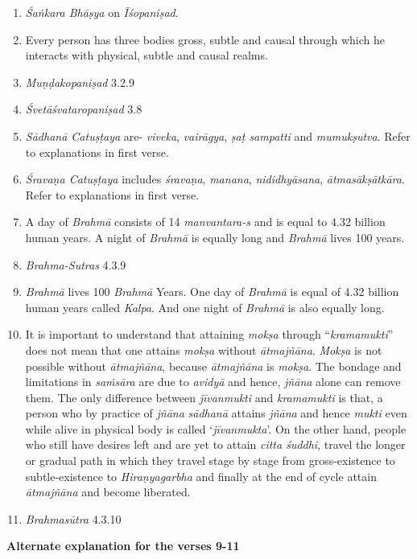 \begin{enumerate}
\itemsep=0pt
\item
  \emph{Śaṅkara Bhāṣya} on \emph{Īśopaniṣad}.
\item
  Every person has three bodies gross, subtle and causal through which he interacts with physical, subtle and causal realms.
\item
  \emph{Muṇḍakopaniṣad} 3.2.9
\item
  \emph{Śvetāśvataropaniṣad} 3.8
\item
  \emph{Sādhanā Catuṣṭaya} are- \emph{viveka}, \emph{vairāgya}, \emph{ṣaṭ sampatti} and \emph{mumu\-kṣutva}. Refer to explanations in first verse.
\item
  \emph{Śravaṇa Catuṣṭaya} includes \emph{śravaṇa}, \emph{manana}, \emph{nididhyāsana}, \emph{ātma\-sākṣāt\-kāra}. Refer to explanations in first verse.
\item
  A day of \emph{Brahmā} consists of 14 \emph{manvantara-s} and is equal to 4.32 billion human years. A night of \emph{Brahmā} is equally long and \emph{Brahmā} lives 100 years.
\item
  \emph{Brahma-Sutras} 4.3.9
\item
  \emph{Brahmā} lives 100 \emph{Brahmā} Years. One day of \emph{Brahmā} is equal of 4.32 billion human years called \emph{Kalpa}. And one night of \emph{Brahmā} is also equally long.
\item
  It is important to understand that attaining \emph{mokṣa} through ``\emph{kramamukti}'' does not mean that one attains \emph{mokṣa} without \emph{ātmajñāna}. \emph{Mokṣa} is not possible without \emph{ātmajñāna}, because \emph{ātmajñāna} is \emph{mokṣa}. The bondage and limitations in \emph{saṁsāra} are due to \emph{avidyā} and hence, \emph{jñāna} alone can remove them. The only difference between \emph{jīvanmukti} and \emph{kramamukti} is that, a person who by practice of \emph{jñāna} \emph{sādhanā} attains \emph{jñāna} and hence \emph{mukti} even while alive in physical body is called `\emph{jīvanmukta}'. On the other hand, people who still have desires left and are yet to attain \emph{citta śuddhi}, travel the longer or gradual path in which they travel stage by stage from gross-existence to subtle-existence to \emph{Hiraṇyagarbha} and finally at the end of cycle attain \emph{ātmajñāna} and become liberated.
\item
  \emph{Brahmasūtra} 4.3.10
\end{enumerate}

\textbf{Alternate explanation for the verses 9-11}

